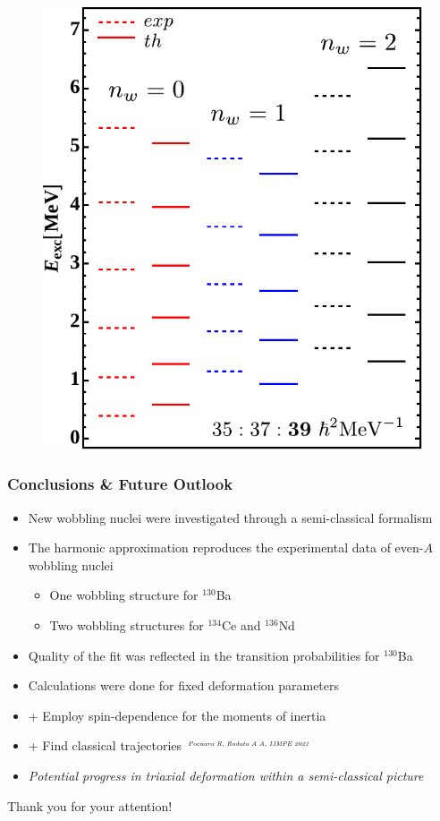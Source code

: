 \documentclass{beamer}
\begin{document}
\begin{frame}
\begin{itemize}
\begin{figure}
    \includegraphics[scale=0.44]{Figs/136Nd-excitation-higher-edited.pdf}
  \end{figure}
\end{itemize}
\end{frame}

\begin{frame}
  \frametitle{Conclusions \& Future Outlook}
  \begin{itemize}
    \item New wobbling nuclei were investigated through a semi-classical formalism
    \item The harmonic approximation reproduces the experimental data of even-$A$ wobbling nuclei
    \begin{itemize}
      \item One wobbling structure for $^{130}$Ba
      \item Two wobbling structures for $^{134}$Ce and $^{136}$Nd 
    \end{itemize}
    \item Quality of the fit was reflected in the transition probabilities for $^{130}$Ba
    \item Calculations were done for fixed deformation parameters
    \item + Employ spin-dependence for the moments of inertia 
    \item + Find classical trajectories $^\text{\tiny\emph{Poenaru R, Raduta A A, IJMPE 2021}}$
    \item \emph{Potential progress in triaxial deformation within a semi-classical picture}
  \end{itemize}
\end{frame}

\begin{frame}
  \begin{center}
    \Large Thank you for your attention!
  \end{center}
\end{frame}

\end{document}
